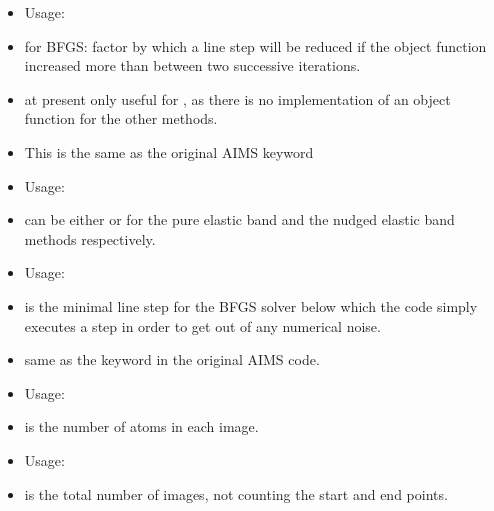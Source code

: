 {\begin{itemize}
    \item Usage:  
    \item for BFGS: factor by which a line step will be reduced if the 
      object function increased more than 
      between two successive iterations. 
    \item at present only useful for  , as there
      is no implementation of an object function for the other methods.
    \item This is the same as the original AIMS keyword 
  \end{itemize}}

{\begin{itemize}
    \item Usage:   \\
    \item {} can be either  or  for the pure 
      elastic band and the nudged elastic band methods respectively.
  \end{itemize}}

{\begin{itemize}
    \item Usage:  
    \item {} is the minimal line step for the BFGS solver 
      below which the code simply executes a step in order to get out of 
      any numerical noise. 
    \item same as the keyword  in the original 
      AIMS code.
  \end{itemize}}

{\begin{itemize}
    \item Usage:  
    \item {} is the number of atoms in each image. 
\end{itemize}}

{\begin{itemize}
    \item Usage:  
    \item {} is the total number of images, not counting the start and end points. 
  \end{itemize}}

